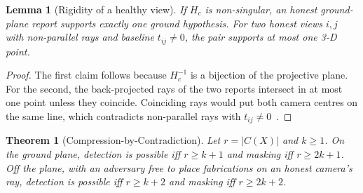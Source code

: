 \documentclass[journal]{IEEEtran}
\newtheorem{theorem}{Theorem}
\newtheorem{lemma}{Lemma}
\theoremstyle{remark}
\begin{document}
\begin{lemma}[Rigidity of a healthy view]\label{lem:rigid}
If $H_c$ is non-singular, an honest ground-plane report supports exactly one ground hypothesis. For two honest views
$i,j$ with non-parallel rays and baseline $t_{ij}\neq 0$, the pair supports at most one 3-D point.
\end{lemma}
\begin{proof}
The first claim follows because $H_c^{-1}$ is a bijection of the projective plane. For the second, the back-projected
rays of the two reports intersect in at most one point unless they coincide. Coinciding rays would put both camera
centres on the same line, which contradicts non-parallel rays with $t_{ij}\neq 0$~\cite{hartley2004multiple}.
\end{proof}

\begin{theorem}[Compression-by-Contradiction]\label{thm:main}
Let $r=|C(X)|$ and $k\ge 1$. On the ground plane, detection is possible iff $r\ge k{+}1$ and masking iff $r\ge 2k{+}1$.
Off the plane, with an adversary free to place fabrications on an honest camera's ray, detection is possible iff
$r\ge k{+}2$ and masking iff $r\ge 2k{+}2$.
\end{theorem}
\end{document}
